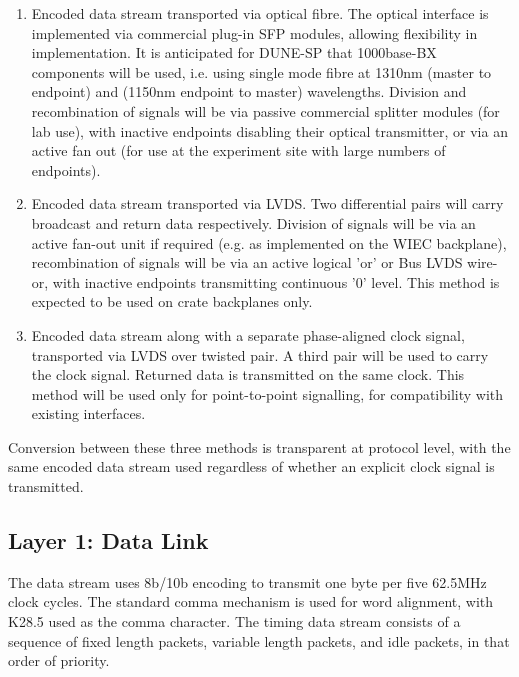 \documentclass[a4paper,11pt]{article}
\begin{document}
\begin{enumerate}
	\item Encoded data stream transported via optical fibre. The optical interface is implemented via commercial plug-in SFP modules, allowing flexibility in implementation. It is anticipated for DUNE-SP that 1000base-BX components will be used, i.e. using single mode fibre at 1310nm (master to endpoint) and (1150nm endpoint to master) wavelengths. Division and recombination of signals will be via passive commercial splitter modules (for lab use), with inactive endpoints disabling their optical transmitter, or via an active fan out (for use at the experiment site with large numbers of endpoints).
	\item Encoded data stream transported via LVDS. Two differential pairs will carry broadcast and return data respectively. Division of signals will be via an active fan-out unit if required (e.g. as implemented on the WIEC backplane), recombination of signals will be via an active logical 'or' or Bus LVDS wire-or, with inactive endpoints transmitting continuous '0' level. This method is expected to be used on crate backplanes only.
	\item Encoded data stream along with a separate phase-aligned clock signal, transported via LVDS over twisted pair. A third pair will be used to carry the clock signal. Returned data is transmitted on the same clock. This method will be used only for point-to-point signalling, for compatibility with existing interfaces.
\end{enumerate}

Conversion between these three methods is transparent at protocol level, with the same encoded data stream used regardless of whether an explicit clock signal is transmitted.

\subsection{Layer 1: Data Link}

The data stream uses 8b/10b encoding to transmit one byte per five 62.5MHz clock cycles. The standard comma mechanism is used for word alignment, with K28.5 used as the comma character. The timing data stream consists of a sequence of fixed length packets, variable length packets, and idle packets, in that order of priority.
\end{document}
